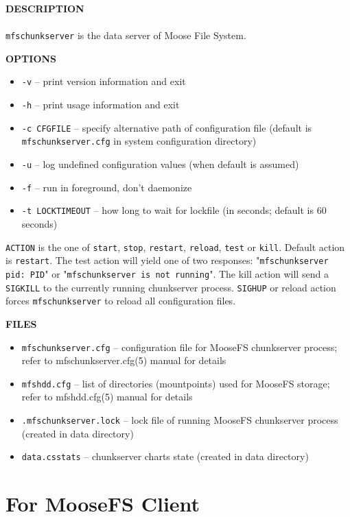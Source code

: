 \documentclass[a4paper,11pt,english]{report}
\def\code#1{\texttt{#1}}
\begin{document}
				\bigskip
				\textbf{DESCRIPTION} \\\\
					\code{mfschunkserver} is the data server of Moose File System.

				\bigskip
				\textbf{OPTIONS}
				\begin{itemize}
					\item \code{-v} -- print version information and exit
					\item \code{-h} -- print usage information and exit
					\item \code{-c CFGFILE} -- specify alternative  path  of  configuration  file  (default  is
						\code{mfschunkserver.cfg} in system configuration directory)
					\item \code{-u} -- log undefined configuration values (when default is assumed)
					\item \code{-f} -- run in foreground, don't daemonize
					\item \code{-t LOCKTIMEOUT} -- how  long  to  wait for lockfile (in seconds; default is 60 seconds)
				\end{itemize}
				
				\bigskip
				\code{ACTION} is the one of \code{start},  \code{stop},  \code{restart},  \code{reload},  \code{test}  or  \code{kill}. Default  action is \code{restart}. The test action will yield one of two responses: "\code{mfschunkserver pid: PID}" or "\code{mfschunkserver  is  not running}".  The  kill action will send a \code{SIGKILL} to the currently running chunkserver process.  \code{SIGHUP}  or  reload  action  forces \code{mfschunkserver} to reload all configuration files.

				\bigskip					
				\textbf{FILES}
				\begin{itemize}
					\item \code{mfschunkserver.cfg} -- configuration  file  for  MooseFS  chunkserver process; refer to mfschunkserver.cfg(5) manual for details
					\item \code{mfshdd.cfg} -- list of directories  (mountpoints)  used  for  MooseFS  storage; refer to mfshdd.cfg(5) manual for details
					\item \code{.mfschunkserver.lock} -- lock  file  of  running  MooseFS chunkserver process (created in data directory)
					\item \code{data.csstats} -- chunkserver charts state (created in data directory)
				\end{itemize}
		
		\section{For MooseFS Client}
\end{document}
